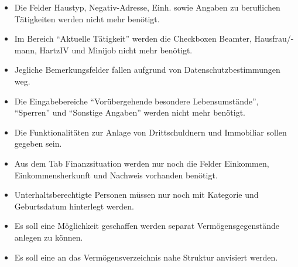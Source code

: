 \label{sec:gespraechsnotizen1}
\begin{itemize}
    \item Die Felder Haustyp, Negativ-Adresse, Einh. sowie Angaben zu beruflichen Tätigkeiten werden nicht mehr benötigt.
    \item Im Bereich \enquote{Aktuelle Tätigkeit} werden die Checkboxen Beamter, Hausfrau/-mann, HartzIV und Minijob nicht mehr benötigt.
    \item Jegliche Bemerkungsfelder fallen aufgrund von Datenschutzbestimmungen weg.
    \item Die Eingabebereiche \enquote{Vorübergehende besondere Lebensumstände}, \enquote{Sperren} und \enquote{Sonstige Angaben} werden nicht mehr benötigt.
    \item Die Funktionalitäten zur Anlage von Drittschuldnern und Immobiliar sollen gegeben sein.
    \item Aus dem Tab Finanzsituation werden nur noch die Felder Einkommen, Einkommensherkunft und Nachweis vorhanden benötigt.
    \item Unterhaltsberechtigte Personen müssen nur noch mit Kategorie und Geburtsdatum hinterlegt werden.
    \item Es soll eine Möglichkeit geschaffen werden separat Vermögensgegenstände anlegen zu können.
    \item Es soll eine an das Vermögensverzeichnis nahe Struktur anvisiert werden.
\end{itemize}